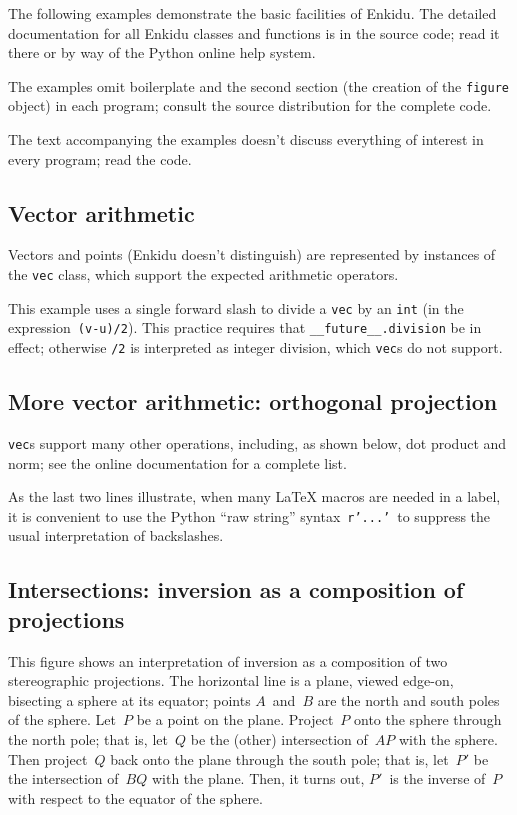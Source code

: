 \documentclass{enkidudoc}
\begin{document}
The following examples demonstrate the basic facilities of Enkidu.
The detailed documentation for all Enkidu classes and functions
is in the source code; read it there or by way of the
Python online help system.

The examples omit boilerplate and the second section
(the creation of the \texttt{figure} object) in each program;
consult the source distribution for the complete code.

The text accompanying the examples
doesn't discuss everything of interest in every program;
read the code.

\subsection{Vector arithmetic}

Vectors and points (Enkidu doesn't distinguish) are represented
by instances of the \texttt{vec} class,
which support the expected arithmetic operators.


\noindent This example uses a single forward slash
to divide a \texttt{vec} by an \texttt{int}
(in the expression~\texttt{(v-u)/2}).
This practice requires that \texttt{\_\_future\_\_.division} be in effect;
otherwise \texttt{/2} is interpreted as integer division,
which \texttt{vec}s do not support.

\pagebreak
\subsection{More vector arithmetic: orthogonal projection}

\texttt{vec}s support many other operations,
including, as shown below, dot product and norm;
see the online documentation for a complete list.


\noindent As the last two lines illustrate,
when many \LaTeX{} macros are needed in a label,
it is convenient to use the Python ``raw string''
syntax~\texttt{r'...'}\ to suppress the usual interpretation of backslashes.

\pagebreak
\subsection{Intersections: inversion as a composition of projections}

This figure shows an interpretation of inversion %
as a composition of two stereographic projections.
The horizontal line is a plane, viewed edge-on,
bisecting a sphere at its equator;
points $A$~and~$B$ are the north and south poles of the sphere.
Let~$P$ be a point on the plane.
Project~$P$ onto the sphere through the north pole;
that is, let~$Q$ be the (other) intersection of~$AP$ with the sphere.
Then project~$Q$ back onto the plane through the south pole;
that is, let~$P'$ be the intersection of~$BQ$ with the plane.
Then, it turns out,
$P'$~is the inverse of~$P$ with respect to the equator of the sphere.
\end{document}
